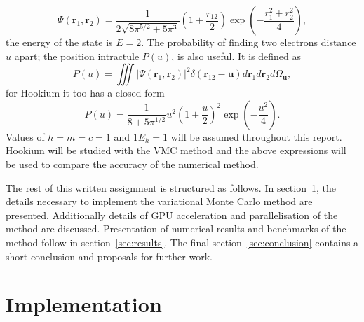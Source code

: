 \documentclass[final,3p,times,twocolumn]{elsarticle}
\begin{document}
	\begin{equation}
		\Psi\left(\mathbf{r}_{1}, \mathbf{r}_{2}\right)=\frac{1}{2 \sqrt{8 \pi^{5 / 2}+5 \pi^{3}}}\left(1+\frac{r_{12}}{2}\right) \exp \left(-\frac{r_{1}^{2}+r_{2}^{2}}{4}\right), 
	\end{equation}
	the energy of the state is $E=2$. 
	The probability of finding two electrons distance $u$ apart; the position intractule $P(u)$, is also useful. It is defined as
	\begin{equation}
		P(u)=\iiint\left|\Psi\left(\mathbf{r}_{1}, \mathbf{r}_{2}\right)\right|^{2} \delta\left(\mathbf{r}_{12}-\mathbf{u}\right) d \mathbf{r}_{1} d \mathbf{r}_{2} d \Omega_{\mathbf{u}},
	\end{equation}
	for Hookium it too has a closed form
	\begin{equation}
		P(u)=\frac{1}{8+5 \pi^{1 / 2}} u^{2}\left(1+\frac{u}{2}\right)^{2} \exp \left(-\frac{u^{2}}{4}\right).
	\end{equation}
	Values of $h=m=c=1$ and $1E_h = 1$ will be assumed throughout this report. 
	Hookium will be studied with the VMC method and the above expressions will be used to compare the accuracy of the numerical method.
	
	The rest of this written assignment is structured as follows. In section~\ref{sec:impl}, the details necessary to implement the variational Monte Carlo method are presented. Additionally details of GPU acceleration and parallelisation of the method are discussed. Presentation of numerical results and benchmarks of the method follow in section~\ref{sec:results}. The final section~\ref{sec:conclusion} contains a short conclusion and proposals for further work. 
	\section{Implementation}
	\label{sec:impl}
	
\end{document}
